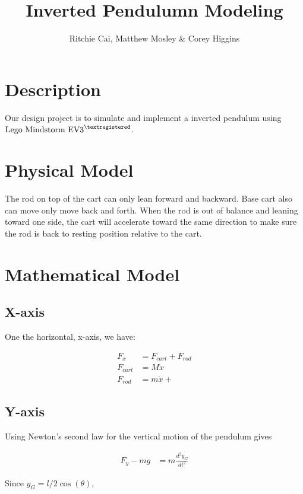 \documentclass{notes}
\author{Ritchie Cai, Matthew Mosley \& Corey Higgins}
\title{Inverted Pendulumn Modeling}
\begin{document}
\maketitle 

\section{Description}
Our design project is to simulate and implement a inverted pendulum using 
$\text{Lego Mindstorm EV3}^{\textregistered}$. 

\section{Physical Model}


The rod on top of the cart can only lean forward and backward. 
Base cart also can move only move back and forth. 
When the rod is out of balance and leaning toward one side, the cart will accelerate toward the same
direction to make sure the rod is back to resting position relative to the cart.

\section{Mathematical Model}

\subsection{X-axis}
One the horizontal, x-axis, we have:

\begin{align*}
  F_x & = F_{cart} + F_{rod} \\
  F_{cart} & = M\ddot{x}  \\
  F_{rod} &  = m\ddot{x} + 
\end{align*}

\subsection{Y-axis}
Using Newton's second law for the vertical motion of the pendulum gives

\begin{align}
  F_y - mg & = m\frac{d^2y_G}{dt^2}\label{eqn:eq1}
 \end{align}
 
 Since $ y_G = l/2\cos(\theta)$,
\end{document}
